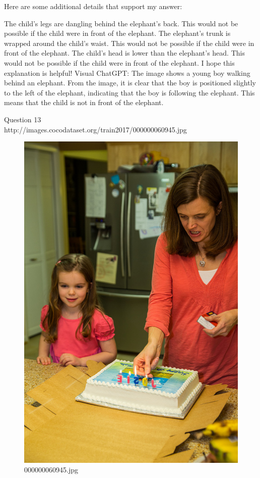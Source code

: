 \begin{enumerate}
        Here are some additional details that support my answer:

        The child's legs are dangling behind the elephant's back. This would not be possible if the child were in front of the elephant.
        The elephant's trunk is wrapped around the child's waist. This would not be possible if the child were in front of the elephant.
        The child's head is lower than the elephant's head. This would not be possible if the child were in front of the elephant.
        I hope this explanation is helpful!
        \subitem Visual ChatGPT: The image shows a young boy walking behind an elephant. From the image, it is clear that the boy is positioned slightly to the left of the elephant, indicating that the boy is following the elephant. This means that the child is not in front of the elephant.
    \end{enumerate}
Question 13\\
http://images.cocodataset.org/train2017/000000060945.jpg
    \begin{figure}[h]
        \centering
        \includegraphics[width=0.8\linewidth]{../image set/easy/000000060945.jpg}
        \caption{000000060945.jpg}
    \end{figure}
